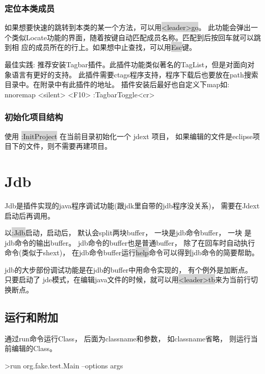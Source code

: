 \documentclass[oneside,openany]{book}
\begin{document}
\subsubsection{定位本类成员}
  如果想要快速的跳转到本类的某一个方法，可以用\colorbox{lightgray}{<leader>go}。
  此功能会弹出一个类似Locate功能的界面，随着按键自动匹配成员名称。匹配到后按回车就可以跳到相
  应的成员所在的行上。如果想中止查找，可以用\colorbox{lightgray}{Esc}键。
  \begin{mdframed}[style=BestPracticeFrame]
    最佳实践: 推荐安装Tagbar插件。此插件功能类似著名的TagList，但是对面向对象语言有更好的支持。
    此插件需要ctags程序支持，程序下载后也要放在path搜索目录中。在附录中有此插件的地址。
    插件安装后最好也自定义下map如:
      nnoremap <silent> <F10> :TagbarToggle<cr>
  \end{mdframed}

\subsubsection{初始化项目结构}
使用 \colorbox{lightgray}{:InitProject} 在当前目录初始化一个 jdext 项目， 如果编辑的文件是eclipse项目下的文件，则不需要再建项目。 

\section{Jdb}
    Jdb是插件实现的java程序调试功能(跟jdk里自带的jdb程序没关系)， 需要在Jdext启动后再调用。

    以\colorbox{lightgray}{:Jdb}启动，启动后， 默认会split两块buffer， 一块是jdb命令buffer， 一块
是jdb命令的输出buffer。 jdb命令的buffer也是普通buffer， 除了在回车时自动执行命令(类似于shext)，
在jdb命令buffer运行\colorbox{lightgray}{help}命令可以得到jdb命令的简要帮助。

    jdb的大步部份调试功能是在jdb的buffer中用命令实现的， 有个例外是加断点。 只要启动了
    jde模式，在编辑java文件的时候，就可以用\colorbox{lightgray}{<leader>tb}来为当前行切换断点。

  \subsection{运行和附加}
    
    通过run命令运行Class， 后面为classname和参数， 如classname省略， 则运行当前编辑的Class。
    \begin{mdframed}[style=SmallFrame]
    \begin{flushleft}
    >run org.fake.test.Main --options args
    \end{flushleft}
    \end{mdframed}
    \vspace{4mm}
\end{document}
